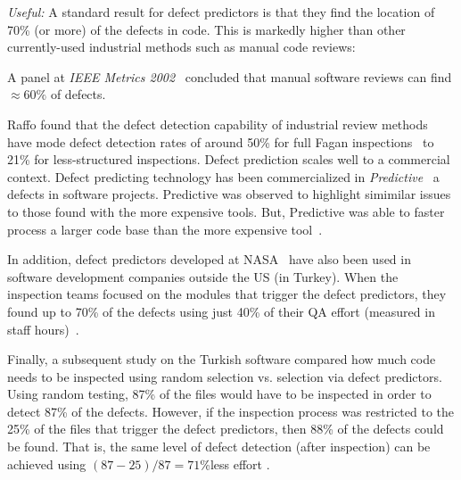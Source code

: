 {\em Useful:}
A
standard result for defect predictors is that they find the location of  70\% (or more)
of the defects in code.
This is markedly
higher than other currently-used
industrial
methods such as manual code reviews:
\bi
\item
A panel at {\em IEEE Metrics
2002}~\cite{shu02} concluded that manual software  reviews can find ${\approx}60\%$ 
of defects.
\item
Raffo found that the defect detection capability of
industrial review methods have mode defect detection rates
of around 50\%
 for full Fagan inspections~\cite{fagan76} to
21\% for less-structured inspections.
\ei
Defect prediction scales well to a commercial
context. Defect predicting technology has been
commercialized in {\it Predictive}~\cite{turner06} a
defects in software projects. Predictive was observed to
highlight simimilar issues to those found   with the more expensive tools. But,
Predictive was able to faster process a larger code
base than the more expensive tool~\cite{turner06}.

In addition, defect predictors developed at NASA~\cite{me07b} have also been used in software development companies outside the US (in Turkey). When the inspection teams focused on the modules that trigger the defect predictors, they found up to 70\% of the defects using just 40\% of their QA effort (measured in staff hours)~\cite{tosun10}.

Finally, a subsequent study on the Turkish software
compared how much code needs to be inspected using
random selection vs. selection via defect
predictors. Using random testing, 87\% of the files
would have to be inspected in order to detect 87\%
of the defects. However, if the inspection process
was restricted to the 25\% of the files that trigger
the defect predictors, then 88\% of the defects
could be found. That is, the same level of defect
detection (after inspection) can be achieved using
$(87-25)/87=71$\%less effort
\cite{tosun09}.

